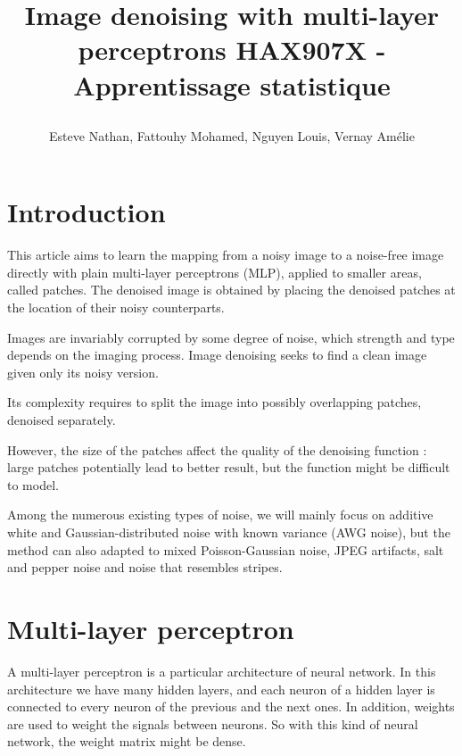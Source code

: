 \documentclass[10pt,a4paper]{article}
\author{Esteve Nathan, Fattouhy Mohamed, Nguyen Louis, Vernay Amélie}
\title{%
    \begin{minipage}\linewidth
        \centering
        Image denoising with multi-layer perceptrons
        \vskip3pt
        \large 
        HAX907X - Apprentissage statistique
    \end{minipage}
}
\newcommand{\svs}{\vspace{9pt}}
\begin{document}
\maketitle

\section{Introduction}

This article \cite{denoise} aims to learn the mapping from a noisy image to a noise-free image directly with plain multi-layer perceptrons (MLP), applied to smaller areas, called patches. The denoised image is obtained by placing the denoised patches at the location of their noisy counterparts.

\svs

Images are invariably corrupted by some degree of noise, which strength and type depends on the imaging process. Image denoising seeks to find a clean image given only its noisy version.

\svs

Its complexity requires to split the image into possibly overlapping patches, denoised separately.

\svs

However, the size of the patches affect the quality of the denoising function : large patches potentially lead to better result, but the function might be difficult to model.

\svs

Among the numerous existing types of noise, we will mainly focus on additive white and Gaussian-distributed noise with known variance (AWG noise), but the method can also adapted to mixed Poisson-Gaussian noise, JPEG artifacts, salt and pepper noise and noise that resembles stripes.


\section{Multi-layer perceptron}

A multi-layer perceptron is a particular architecture of neural network. In this architecture we have many hidden layers, and each neuron of a hidden layer is connected to every neuron of the previous and the next ones.  In addition, weights are used to weight the signals between neurons. So with this kind of neural network, the weight matrix might be dense.

\end{document}
